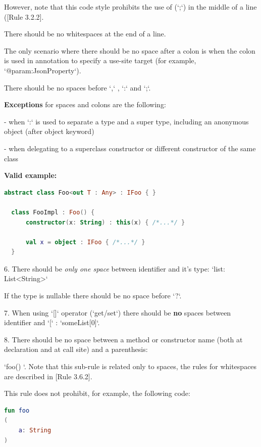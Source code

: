 {{{{    However, note that this code style prohibits the use of (`;`) in the middle of a line ([Rule 3.2.2].

    There should be no whitespaces at the end of a line.

    The only scenario where there should be no space after a colon is when the colon is used in annotation to specify a use-site target (for example, `@param:JsonProperty`).

    There should be no spaces before `,` , `:` and `;`.

    \textbf{Exceptions} for spaces and colons are the following:



    - when `:` is used to separate a type and a super type, including an anonymous object (after object keyword)

    - when delegating to a superclass constructor or different constructor of the same class



\textbf{Valid example:}

\begin{lstlisting}[language=Kotlin]
  abstract class Foo<out T : Any> : IFoo { }

  class FooImpl : Foo() {
      constructor(x: String) : this(x) { /*...*/ }

      val x = object : IFoo { /*...*/ }
  }
\end{lstlisting}


6. There should be \textit{only one space} between identifier and it's type: `list: List<String>`

If the type is nullable there should be no space before `?`.



7. When using `[]` operator (`get/set`) there should be \textbf{no} spaces between identifier and `[` : `someList[0]`.



8. There should be no space between a method or constructor name (both at declaration and at call site) and a parenthesis:

   `foo() {}`. Note that this sub-rule is related only to spaces, the rules for whitespaces are described in [Rule 3.6.2].

    This rule does not prohibit, for example, the following code:

\begin{lstlisting}[language=Kotlin]
fun foo
(
    a: String
)
\end{lstlisting}


}}}}
